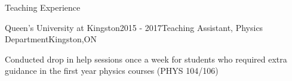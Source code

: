 \documentclass{resume2} %
\begin{document}
\begin{rSection}{Teaching Experience}
	
	\begin{rSubsection}{Queen's University at Kingston}{2015 - 2017}{Teaching Assistant, Physics Department}{Kingston,ON}
		\item Conducted drop in help sessions once a week for students who required extra guidance in the first year physics courses (PHYS 104/106)
	\end{rSubsection}

\end{rSection}

\end{document}
